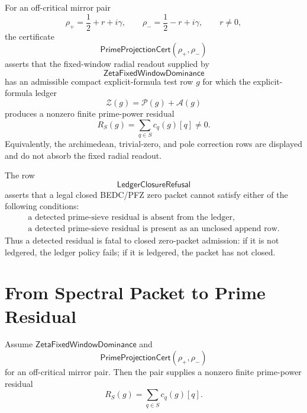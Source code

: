 \begin{definition}[PrimeProjectionCert]
\label{def:rh-prime-projection-cert}
For an off-critical mirror pair
$$
\rho_+=\frac12+r+i\gamma,
\qquad
\rho_-=\frac12-r+i\gamma,
\qquad
r\ne0,
$$
the certificate
$$
\mathsf{PrimeProjectionCert}(\rho_+,\rho_-)
$$
asserts that the fixed-window radial readout supplied by
$$
\mathsf{ZetaFixedWindowDominance}
$$
has an admissible compact explicit-formula test row $g$ for which the
explicit-formula ledger
$$
\mathcal Z(g)=\mathcal P(g)+\mathcal A(g)
$$
produces a nonzero finite prime-power residual
$$
R_S(g)=\sum_{q\in S}c_q(g)[q]\ne0.
$$
Equivalently, the archimedean, trivial-zero, and pole correction rows
are displayed and do not absorb the fixed radial readout.
\end{definition}

\begin{definition}[LedgerClosureRefusal]
\label{def:rh-ledger-closure-refusal}
The row
$$
\mathsf{LedgerClosureRefusal}
$$
asserts that a legal closed BEDC/PFZ zero packet cannot satisfy either
of the following conditions:
$$
\begin{gathered}
\text{a detected prime-sieve residual is absent from the ledger},\\
\text{a detected prime-sieve residual is present as an unclosed append row}.
\end{gathered}
$$
Thus a detected residual is fatal to closed zero-packet admission: if it
is not ledgered, the ledger policy fails; if it is ledgered, the packet
has not closed.
\end{definition}

\section{From Spectral Packet to Prime Residual}
\label{sec:rh-offline-zero-prime-sieve-spectral-to-prime}

\begin{theorem}
\label{thm:rh-fixed-packet-gives-finite-prime-residual}
Assume $\mathsf{ZetaFixedWindowDominance}$ and
$$
\mathsf{PrimeProjectionCert}(\rho_+,\rho_-)
$$
for an off-critical mirror pair.  Then the pair supplies a nonzero
finite prime-power residual
$$
R_S(g)=\sum_{q\in S}c_q(g)[q].
$$
\end{theorem}

